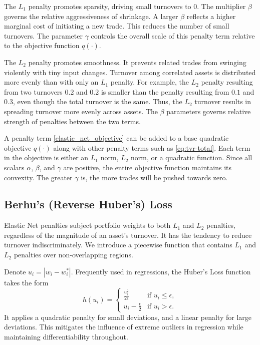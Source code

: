 \documentclass[11pt, letterpaper]{article}
\begin{document}
The $L_1$ penalty promotes sparsity, driving small turnovers to $0$. The multiplier $\beta$ governs the relative aggressiveness
of shrinkage. A larger $\beta$ reflects a higher marginal cost of initiating a new trade. This reduces the number of small
turnovers. The parameter $\gamma$ controls the overall scale of this penalty term relative to the objective function $q(\cdot)$.

The $L_2$ penalty promotes smoothness. It prevents related trades from swinging violently with tiny input changes. Turnover
among correlated assets is distributed more evenly than with only an $L_1$ penalty. For example, the $L_2$ penalty resulting
from two turnovers $0.2$ and $0.2$ is smaller than the penalty resulting from $0.1$ and $0.3$, even though the total turnover is
the same. Thus, the $L_2$ turnover results in spreading turnover more evenly across assets. The $\beta$ parameters governs
relative strength of penalties between the two terms.

A penalty term \eqref{elastic_net_objective} can be added to a base quadratic objective $q(\cdot)$ along with other penalty
terms such as \eqref{eq:tvr-total}.  Each term in the objective is either an $L_1$ norm, $L_2$ norm, or a quadratic
function. Since all scalars $\alpha$, $\beta$, and $\gamma$ are positive, the entire objective function maintains its
convexity. The greater $\gamma$ is, the more trades will be pushed towards zero.

\subsection{Berhu's (Reverse Huber's) Loss}
Elastic Net penalties subject portfolio weights to both $L_1$ and $L_2$ penalties, regardless of the magnitude of an asset's
turnover. It has the tendency to reduce turnover indiscriminately. We introduce a piecewise function that contains $L_1$ and
$L_2$ penalties over non-overlapping regions.

Denote $u_i = |w_i - w_i^*|$. Frequently used in regressions, the Huber's Loss function takes the form
\begin{equation}
\label{huber_loss}
    h(u_i) = \begin{cases}
        \frac{u_i^2}{2\epsilon} & \text{if } u_i \leq \epsilon, \\
        u_i - \frac{\epsilon}{2} & \text{if } u_i > \epsilon.
    \end{cases}
\end{equation}
It applies a quadratic penalty for small deviations, and a linear penalty for large deviations. This mitigates the influence of
extreme outliers in regression while maintaining differentiability throughout.
\end{document}
